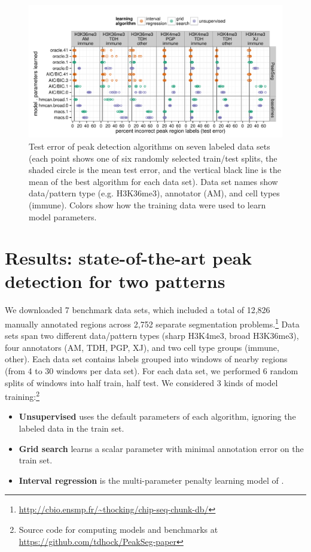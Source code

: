 \documentclass{article}
\begin{document}
\begin{figure}[b!]
  \centering
  \includegraphics[width=\textwidth]{figure-dp-peaks-regression-dots}
  \vskip -0.5cm
  \caption{Test error of peak detection algorithms on seven labeled
    data sets (each point shows one of six randomly selected
    train/test splits, the shaded circle is the mean test error, and
    the vertical black line is the mean of the best algorithm for each
    data set). Data set names show data/pattern type (e.g. H3K36me3),
    annotator (AM), and cell types (immune). Colors show how the
    training data were used to learn model parameters.}
  \label{fig:test-error}
\end{figure}

\section{Results: state-of-the-art peak detection
  for two patterns}
\label{sec:results}

We downloaded 7 benchmark data sets, which included a total of 12,826
manually annotated regions across 2,752 separate segmentation
problems.\footnote{\url{http://cbio.ensmp.fr/~thocking/chip-seq-chunk-db/}}
Data sets span two different data/pattern types (sharp H3K4me3, broad
H3K36me3), four annotators (AM, TDH, PGP, XJ), and two cell type
groups (immune, other). Each data set contains labels grouped into
windows of nearby regions (from 4 to 30 windows per data set). For
each data set, we performed 6 random splits of windows into half
train, half test.  We
considered 3 kinds of model training:\footnote{Source code for computing models and benchmarks at\\
  \url{https://github.com/tdhock/PeakSeg-paper} }
\begin{itemize}
\item \textbf{Unsupervised} uses the default parameters of each
  algorithm, ignoring the labeled data in the train set.
\item \textbf{Grid search} learns a scalar parameter with minimal
  annotation error on the train set.
\item \textbf{Interval regression} is the multi-parameter
  penalty learning model of \citet{HOCKING-penalties}.
\end{itemize}
\end{document}
